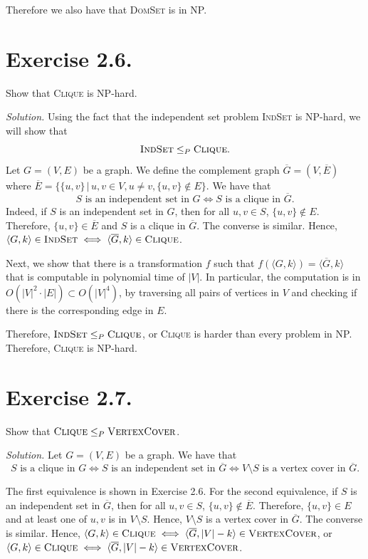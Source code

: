 Therefore we also have that \textsc{DomSet} is in NP.

\section{Exercise 2.6.} Show that \textsc{Clique} is NP-hard.

\textit{Solution.} Using the fact that the independent set problem \textsc{IndSet} is NP-hard, we will show that
$$\textsc{IndSet} \le_P \textsc{Clique}.$$
Let $G = (V,E)$ be a graph. We define the complement graph $\overline{G} = (V, \overline{E})$ where $\overline{E} = \{\{u,v\} \,|\, u,v \in V, u \neq v, \{u,v\} \notin E\}$. We have that
\[S \text{ is an independent set in } G \iff S \text{ is a clique in } \overline{G}.\]
Indeed, if $S$ is an independent set in $G$, then for all $u,v \in S$, $\{u,v\} \notin E$. Therefore, $\{u,v\} \in \overline{E}$ and $S$ is a clique in $\overline{G}$. The converse is similar. Hence, $\langle G,k\rangle \in \textsc{IndSet} \iff \langle \overline{G}, k\rangle \in \textsc{Clique}$.

Next, we show that there is a transformation $f$ such that $f(\langle G,k\rangle) = \langle \overline{G}, k\rangle$ that is computable in polynomial time of $|V|$. In particular, the computation is in $O(|V|^2\cdot|E|)\subset O(|V|^4)$, by traversing all pairs of vertices in $V$ and checking if there is the corresponding edge in $E$.

Therefore, $\textsc{IndSet} \le_P \textsc{Clique}$, or \textsc{Clique} is harder than every problem in NP. Therefore, \textsc{Clique} is NP-hard.

\section{Exercise 2.7.} Show that $\textsc{Clique}\le_P\textsc{VertexCover}$.

\textit{Solution.} Let $G = (V,E)$ be a graph. We have that
\[S \text{ is a clique in } G \iff S \text{ is an independent set in } \overline{G} \iff  V\setminus S \text{ is a vertex cover in } \overline{G}.\]

The first equivalence is shown in Exercise 2.6. For the second equivalence, if $S$ is an independent set in $\overline{G}$, then for all $u,v \in S$, $\{u,v\} \notin \overline{E}$. Therefore, $\{u,v\} \in E$ and at least one of $u,v$ is in $V\setminus S$. Hence, $V\setminus S$ is a vertex cover in $\overline{G}$. The converse is similar. Hence, $\langle G,k\rangle \in \textsc{Clique} \iff \langle \overline{G}, |V|-k\rangle \in \textsc{VertexCover}$, or $\langle G,k\rangle \in \textsc{Clique} \iff \langle \overline{G}, |V|-k\rangle \in \textsc{VertexCover}$.

